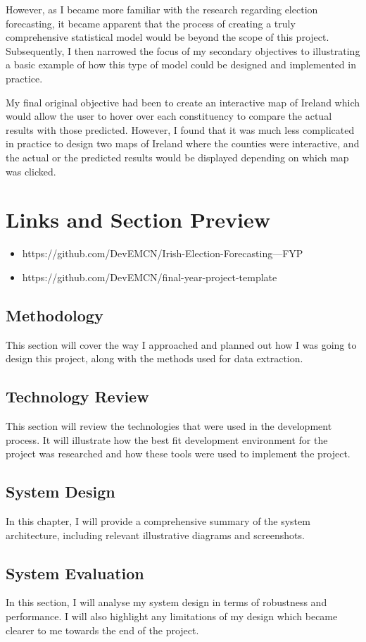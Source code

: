 However, as I became more familiar with the research regarding election forecasting, it became apparent that the process of creating a truly comprehensive statistical model would be beyond the scope of this project.  Subsequently, I then narrowed the focus of my secondary objectives to illustrating a basic example of how this type of model could be designed and implemented in practice. 

My final original objective had been to create an interactive map of Ireland which would allow the user to hover over each constituency to compare the actual results with those predicted.  However, I  found that it was much less complicated in practice to design two maps of Ireland where the counties were interactive, and the actual or the predicted results would be displayed depending on which map was clicked. 

\section{Links and Section Preview}
\begin{itemize}
	\item https://github.com/DevEMCN/Irish-Election-Forecasting---FYP
	\item https://github.com/DevEMCN/final-year-project-template
\end{itemize}
\subsection{Methodology}
This section will cover the way I approached and planned out how I was going to design this project, along with the methods used for data extraction. 
\subsection{Technology Review}
This section will review the technologies that were used in the development process. It will illustrate how the best fit development environment for the project was researched and how these tools were used to implement the project.
\subsection{System Design}
In this chapter, I will provide a comprehensive summary of the system architecture, including relevant illustrative diagrams and screenshots. 
\subsection{System Evaluation}
In this section, I will analyse my system design in terms of robustness and performance. I will also highlight any limitations of my design which became clearer to me towards the end of the project. 

